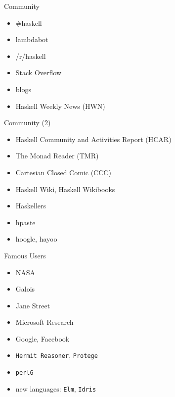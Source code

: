 \documentclass{beamer}
\begin{document}
\begin{frame}{Community}
  \begin{itemize}[<+->]
    \item \#haskell
    \item lambdabot
    \item /r/haskell
    \item Stack Overflow
    \item blogs
    \item Haskell Weekly News (HWN)
  \end{itemize}
\end{frame}

\begin{frame}{Community (2)}
  \begin{itemize}[<+->]
    \item Haskell Community and Activities Report (HCAR)
    \item The Monad Reader (TMR)
    \item Cartesian Closed Comic (CCC)
    \item Haskell Wiki, Haskell Wikibooks
    \item Haskellers
    \item hpaste
    \item hoogle, hayoo
  \end{itemize}
\end{frame}

\begin{frame}{Famous Users}
  \begin{itemize}[<+->]
    \item NASA
    \item Galois
    \item Jane Street
    \item Microsoft Research
    \item Google, Facebook
    \item \texttt{Hermit Reasoner}, \texttt{Protege}
    \item \texttt{perl6}
    \item new languages: \texttt{Elm}, \texttt{Idris}
  \end{itemize}
\end{frame}
\end{document}
